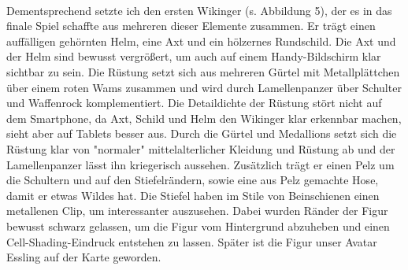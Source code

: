\documentclass[extern,palatino]{cgBA}
\begin{document}
\\Dementsprechend setzte ich den ersten Wikinger (s. Abbildung 5), der es in das finale Spiel schaffte aus mehreren dieser Elemente zusammen. Er trägt einen auffälligen gehörnten Helm, eine Axt und ein hölzernes Rundschild. Die Axt und der Helm sind bewusst vergrößert, um auch auf einem Handy-Bildschirm klar sichtbar zu sein. Die Rüstung setzt sich aus mehreren Gürtel mit Metallplättchen über einem roten Wams zusammen und wird durch Lamellenpanzer über Schulter und Waffenrock komplementiert. Die Detaildichte der Rüstung stört nicht auf dem Smartphone, da Axt, Schild und Helm den Wikinger klar erkennbar machen, sieht aber auf Tablets besser aus. Durch die Gürtel und Medallions setzt sich die Rüstung klar von "normaler" mittelalterlicher Kleidung und Rüstung ab und der Lamellenpanzer lässt ihn kriegerisch aussehen. Zusätzlich trägt er einen Pelz um die Schultern und auf den Stiefelrändern, sowie eine aus Pelz gemachte Hose, damit er etwas Wildes hat. Die Stiefel haben im Stile von Beinschienen einen metallenen Clip, um interessanter auszusehen. Dabei wurden Ränder der Figur bewusst schwarz gelassen, um die Figur vom Hintergrund abzuheben und einen Cell-Shading-Eindruck entstehen zu lassen. Später ist die Figur unser Avatar Essling auf der Karte geworden.


\newpage
\end{document}
